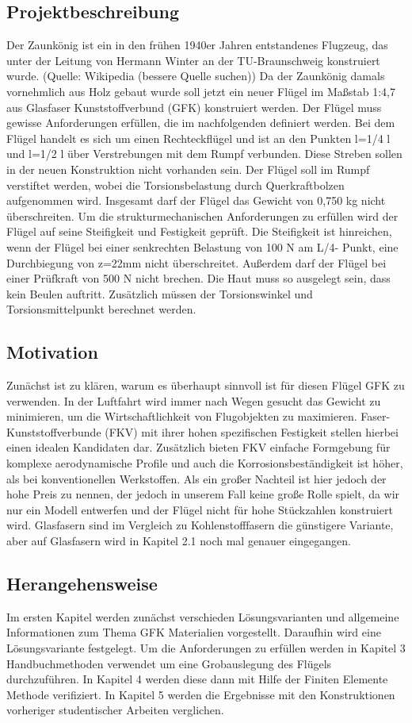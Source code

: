 \subsection{Projektbeschreibung}
Der Zaunkönig ist ein in den frühen 1940er Jahren entstandenes Flugzeug, das unter der Leitung von Hermann Winter an der TU-Braunschweig konstruiert wurde. (Quelle: Wikipedia (bessere Quelle suchen)) Da der Zaunkönig damals vornehmlich aus Holz gebaut wurde soll jetzt ein neuer Flügel im Maßstab 1:4,7 aus Glasfaser Kunststoffverbund (GFK) konstruiert werden. Der Flügel muss gewisse Anforderungen erfüllen, die im nachfolgenden definiert werden.
Bei dem Flügel handelt es sich um einen Rechteckflügel und ist an den Punkten l=1/4 l und l=1/2 l über Verstrebungen mit dem Rumpf verbunden. Diese Streben sollen in der neuen Konstruktion nicht vorhanden sein. Der Flügel soll im Rumpf verstiftet werden, wobei die Torsionsbelastung durch Querkraftbolzen aufgenommen wird. Insgesamt darf der Flügel das Gewicht von 0,750 kg nicht überschreiten.
Um die strukturmechanischen Anforderungen zu erfüllen wird der Flügel auf seine Steifigkeit und Festigkeit geprüft. Die Steifigkeit ist hinreichen, wenn der Flügel bei einer senkrechten Belastung von 100 N am L/4- Punkt, eine Durchbiegung von z=22mm nicht überschreitet. Außerdem darf der Flügel bei einer Prüfkraft von 500 N nicht brechen. Die Haut muss so ausgelegt sein, dass kein Beulen auftritt. Zusätzlich müssen der Torsionswinkel und Torsionsmittelpunkt berechnet werden.
\subsection{Motivation}
Zunächst ist zu klären, warum es überhaupt sinnvoll ist für diesen Flügel GFK zu verwenden. In der Luftfahrt wird immer nach Wegen gesucht das Gewicht zu minimieren, um die Wirtschaftlichkeit von Flugobjekten zu maximieren. Faser-Kunststoffverbunde (FKV) mit ihrer hohen spezifischen Festigkeit stellen hierbei einen idealen Kandidaten dar. Zusätzlich bieten FKV einfache Formgebung für komplexe aerodynamische Profile und auch die Korrosionsbeständigkeit ist höher, als bei konventionellen Werkstoffen. Als ein großer Nachteil ist hier jedoch der hohe Preis zu nennen, der jedoch in unserem Fall keine große Rolle spielt, da wir nur ein Modell entwerfen und der Flügel nicht für hohe Stückzahlen konstruiert wird. Glasfasern sind im Vergleich zu Kohlenstofffasern die günstigere Variante, aber auf Glasfasern wird in Kapitel 2.1 noch mal genauer eingegangen.
\subsection{Herangehensweise}
Im ersten Kapitel werden zunächst verschieden Lösungsvarianten und allgemeine Informationen zum Thema GFK Materialien vorgestellt. Daraufhin wird eine Lösungsvariante festgelegt. Um die Anforderungen zu erfüllen werden in Kapitel 3 Handbuchmethoden verwendet um eine Grobauslegung des Flügels durchzuführen. In Kapitel 4 werden diese dann mit Hilfe der Finiten Elemente Methode verifiziert. In Kapitel 5 werden die Ergebnisse mit den Konstruktionen vorheriger studentischer Arbeiten verglichen.